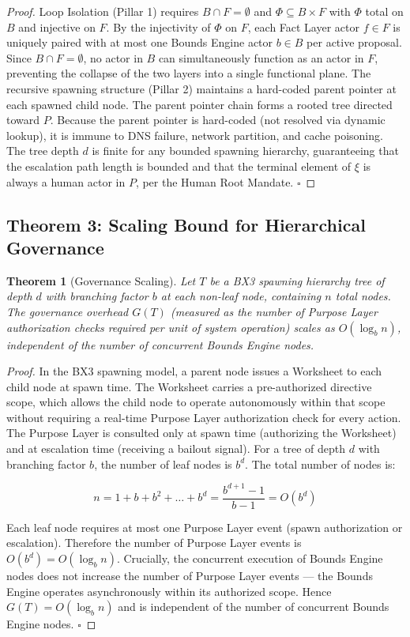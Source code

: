 \documentclass[12pt]{article}
\theoremstyle{plain}
\newtheorem{thrm}{Theorem}[section]
\begin{document}
\begin{proof}
Loop Isolation (Pillar 1) requires $B \cap F = \emptyset$ and $\Phi \subseteq B \times F$ with $\Phi$ total on $B$ and injective on $F$. By the injectivity of $\Phi$ on $F$, each Fact Layer actor $f \in F$ is uniquely paired with at most one Bounds Engine actor $b \in B$ per active proposal. Since $B \cap F = \emptyset$, no actor in $B$ can simultaneously function as an actor in $F$, preventing the collapse of the two layers into a single functional plane. The recursive spawning structure (Pillar 2) maintains a hard-coded parent pointer at each spawned child node. The parent pointer chain forms a rooted tree directed toward $P$. Because the parent pointer is hard-coded (not resolved via dynamic lookup), it is immune to DNS failure, network partition, and cache poisoning. The tree depth $d$ is finite for any bounded spawning hierarchy, guaranteeing that the escalation path length is bounded and that the terminal element of $\xi$ is always a human actor in $P$, per the Human Root Mandate. $\square$
\end{proof}

\subsection{Theorem 3: Scaling Bound for Hierarchical Governance}\label{thrm:scaling}

\begin{thrm}[Governance Scaling]\label{thrm:governance-scaling}
Let $T$ be a BX3 spawning hierarchy tree of depth $d$ with branching factor $b$ at each non-leaf node, containing $n$ total nodes. The governance overhead $G(T)$ (measured as the number of Purpose Layer authorization checks required per unit of system operation) scales as $O(\log_b n)$, independent of the number of concurrent Bounds Engine nodes.
\end{thrm}

\begin{proof}
In the BX3 spawning model, a parent node issues a Worksheet to each child node at spawn time. The Worksheet carries a pre-authorized directive scope, which allows the child node to operate autonomously within that scope without requiring a real-time Purpose Layer authorization check for every action. The Purpose Layer is consulted only at spawn time (authorizing the Worksheet) and at escalation time (receiving a bailout signal). For a tree of depth $d$ with branching factor $b$, the number of leaf nodes is $b^d$. The total number of nodes is:

\[
n = 1 + b + b^2 + \dots + b^d = \frac{b^{d+1} - 1}{b - 1} = O(b^d)
\]

Each leaf node requires at most one Purpose Layer event (spawn authorization or escalation). Therefore the number of Purpose Layer events is $O(b^d) = O(\log_b n)$. Crucially, the concurrent execution of Bounds Engine nodes does not increase the number of Purpose Layer events --- the Bounds Engine operates asynchronously within its authorized scope. Hence $G(T) = O(\log_b n)$ and is independent of the number of concurrent Bounds Engine nodes. $\square$
\end{proof}
\end{document}
